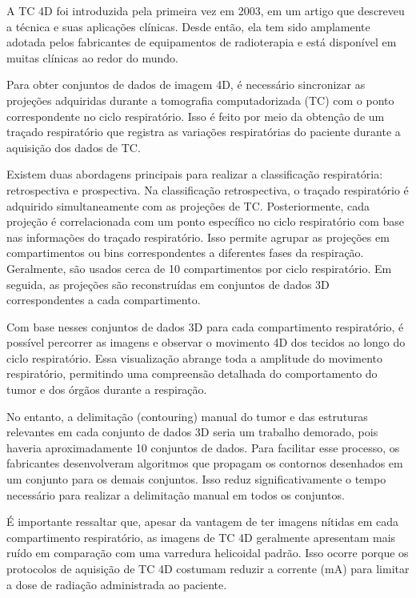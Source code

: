 \documentclass[11pt,a4paper]{article}
\begin{document}
	A TC 4D foi introduzida pela primeira vez em 2003, em um artigo que descreveu a técnica e suas aplicações clínicas. Desde então, ela tem sido amplamente adotada pelos fabricantes de equipamentos de radioterapia e está disponível em muitas clínicas ao redor do mundo. 

	Para obter conjuntos de dados de imagem 4D, é necessário sincronizar as projeções adquiridas durante a tomografia computadorizada (TC) com o ponto correspondente no ciclo respiratório. Isso é feito por meio da obtenção de um traçado respiratório que registra as variações respiratórias do paciente durante a aquisição dos dados de TC.

	Existem duas abordagens principais para realizar a classificação respiratória: retrospectiva e prospectiva. Na classificação retrospectiva, o traçado respiratório é adquirido simultaneamente com as projeções de TC. Posteriormente, cada projeção é correlacionada com um ponto específico no ciclo respiratório com base nas informações do traçado respiratório. Isso permite agrupar as projeções em compartimentos ou bins correspondentes a diferentes fases da respiração. Geralmente, são usados cerca de 10 compartimentos por ciclo respiratório. Em seguida, as projeções são reconstruídas em conjuntos de dados 3D correspondentes a cada compartimento.

	Com base nesses conjuntos de dados 3D para cada compartimento respiratório, é possível percorrer as imagens e observar o movimento 4D dos tecidos ao longo do ciclo respiratório. Essa visualização abrange toda a amplitude do movimento respiratório, permitindo uma compreensão detalhada do comportamento do tumor e dos órgãos durante a respiração.

	No entanto, a delimitação (contouring) manual do tumor e das estruturas relevantes em cada conjunto de dados 3D seria um trabalho demorado, pois haveria aproximadamente 10 conjuntos de dados. Para facilitar esse processo, os fabricantes desenvolveram algoritmos que propagam os contornos desenhados em um conjunto para os demais conjuntos. Isso reduz significativamente o tempo necessário para realizar a delimitação manual em todos os conjuntos.

	É importante ressaltar que, apesar da vantagem de ter imagens nítidas em cada compartimento respiratório, as imagens de TC 4D geralmente apresentam mais ruído em comparação com uma varredura helicoidal padrão. Isso ocorre porque os protocolos de aquisição de TC 4D costumam reduzir a corrente (mA) para limitar a dose de radiação administrada ao paciente.
\end{document}
